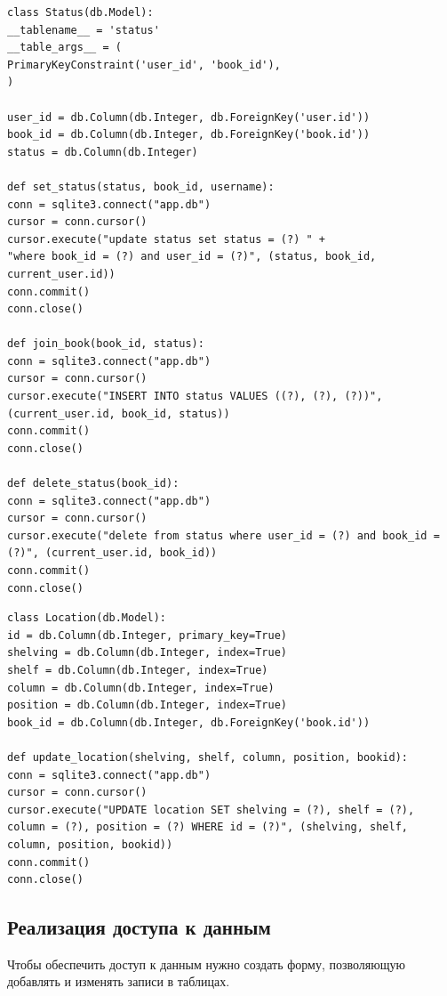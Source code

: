 \documentclass[12pt]{article}
\begin{document}
\begin{lstlisting}[label=some-code, caption=Класс <<Статус>>]
class Status(db.Model):
__tablename__ = 'status'
__table_args__ = (
PrimaryKeyConstraint('user_id', 'book_id'),
)

user_id = db.Column(db.Integer, db.ForeignKey('user.id'))
book_id = db.Column(db.Integer, db.ForeignKey('book.id'))
status = db.Column(db.Integer)

def set_status(status, book_id, username):
conn = sqlite3.connect("app.db")
cursor = conn.cursor()
cursor.execute("update status set status = (?) " +
"where book_id = (?) and user_id = (?)", (status, book_id, current_user.id))
conn.commit()
conn.close()

def join_book(book_id, status):
conn = sqlite3.connect("app.db")
cursor = conn.cursor()
cursor.execute("INSERT INTO status VALUES ((?), (?), (?))", (current_user.id, book_id, status))
conn.commit()
conn.close()

def delete_status(book_id):
conn = sqlite3.connect("app.db")
cursor = conn.cursor()
cursor.execute("delete from status where user_id = (?) and book_id = (?)", (current_user.id, book_id))
conn.commit()
conn.close()

\end{lstlisting}

\begin{lstlisting}[label=some-code, caption=Класс <<Локация>>]
class Location(db.Model):
id = db.Column(db.Integer, primary_key=True)
shelving = db.Column(db.Integer, index=True)
shelf = db.Column(db.Integer, index=True)
column = db.Column(db.Integer, index=True)
position = db.Column(db.Integer, index=True)
book_id = db.Column(db.Integer, db.ForeignKey('book.id'))

def update_location(shelving, shelf, column, position, bookid):
conn = sqlite3.connect("app.db")
cursor = conn.cursor()
cursor.execute("UPDATE location SET shelving = (?), shelf = (?), column = (?), position = (?) WHERE id = (?)", (shelving, shelf, column, position, bookid))
conn.commit()
conn.close()
\end{lstlisting}


\subsection{Реализация доступа к данным}%
\setcounter{subsection}{3}

Чтобы обеспечить доступ к данным нужно создать форму, позволяющую добавлять и изменять записи в таблицах.
\end{document}
